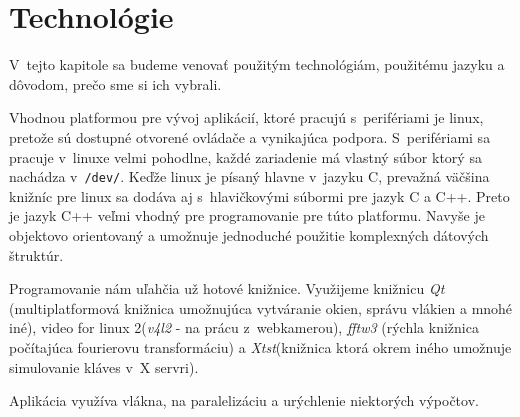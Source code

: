 \chapter{Technológie}\label{chap:tech}

V~tejto kapitole sa budeme venovať použitým technológiám, použitému jazyku a dôvodom, prečo sme si ich vybrali.
\bigskip

Vhodnou platformou pre vývoj aplikácií, ktoré pracujú s~perifériami je linux, pretože sú dostupné otvorené ovládače a vynikajúca podpora. S~perifériami sa pracuje v~linuxe velmi pohodlne, každé zariadenie má vlastný súbor ktorý sa nachádza v~{\tt /dev/}.
Keďže linux je písaný hlavne v~jazyku C, prevažná väčšina knižníc pre linux sa dodáva aj s~hlavičkovými súbormi pre jazyk C a C++.
Preto je jazyk C++ veľmi vhodný pre programovanie pre túto platformu. Navyše je objektovo orientovaný a umožnuje jednoduché použitie komplexných dátových štruktúr.

Programovanie nám uľahčia už hotové knižnice. Využijeme knižnicu \textit{Qt} (multiplatformová knižnica umožnujúca vytváranie okien, správu vlákien a mnohé iné),
video for linux 2(\textit{v4l2} - na prácu z~webkamerou), \textit{fftw3} (rýchla knižnica počítajúca fourierovu transformáciu) a \textit{Xtst}(knižnica ktorá okrem iného umožnuje simulovanie kláves v~X servri).

Aplikácia využíva vlákna, na paralelizáciu a urýchlenie niektorých výpočtov.
